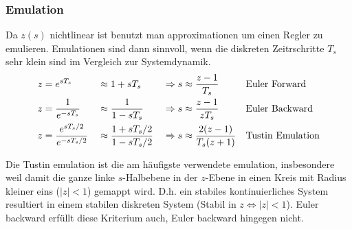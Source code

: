     \subsubsection{Emulation}
        Da $z(s)$ nichtlinear ist benutzt man approximationen um einen Regler zu emulieren. Emulationen sind dann sinnvoll, wenn die diskreten Zeitrschritte $T_s$ sehr klein sind im Vergleich zur Systemdynamik.
        \begin{align*}
            z &= e^{sT_s}    &   &\approx 1+sT_s    &   &\Rightarrow s\approx \frac{z-1}{T_s} &   &\textnormal{Euler Forward}\\
            z &= \frac{1}{e^{-sT_s}}    &   &\approx \frac{1}{1-sT_s}    &   &\Rightarrow s\approx \frac{z-1}{zT_s}  &   &\textnormal{Euler Backward}\\
            z &= \frac{e^{sT_s/2}}{e^{-sT_s/2}}    &   &\approx \frac{1+sT_s/2}{1-sT_s/2}    &   &\Rightarrow s\approx \frac{2(z-1)}{T_s(z+1)}  &   &\textnormal{Tustin Emulation}\\
        \end{align*}
        
        Die Tustin emulation ist die am häufigste verwendete emulation, insbesondere weil damit die ganze linke $s$-Halbebene in der $z$-Ebene in einen Kreis mit Radius kleiner eins ($|z|<1$) gemappt wird. D.h. ein stabiles kontinuierliches System resultiert in einem stabilen diskreten System (Stabil in $z \Leftrightarrow |z|<1$). Euler backward erfüllt diese Kriterium auch, Euler backward hingegen nicht. 
        

    
    